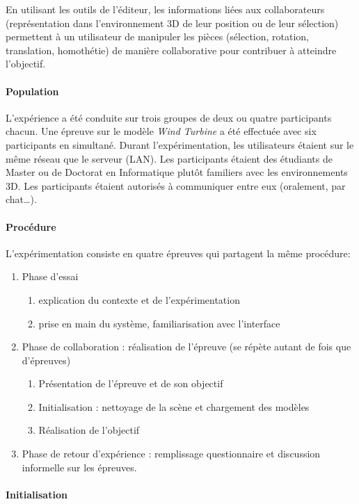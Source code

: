 En utilisant les outils de l'éditeur, les informations liées aux collaborateurs 
(représentation dans l'environnement \gls{3D} de leur position ou de leur sélection) permettent à un 
utilisateur de manipuler les pièces (sélection, rotation, translation, 
homothétie) de manière collaborative pour contribuer à atteindre l'objectif. 
\paragraph{Population}
L'expérience a été conduite sur trois groupes de deux ou quatre participants 
chacun. Une épreuve sur le modèle \textit{Wind Turbine} a été effectuée avec six participants 
en simultané.
Durant l'expérimentation, les utilisateurs étaient sur le même réseau que le serveur 
(\gls{LAN}). 
Les participants étaient des étudiants de Master ou de Doctorat en Informatique 
plutôt familiers avec les environnements \gls{3D}. Les participants étaient 
autorisés à 
communiquer entre eux (oralement, par chat\dots).
\paragraph{Procédure}
L'expérimentation consiste en quatre épreuves qui partagent la même procédure:
\begin{enumerate}
	\item Phase d'essai 
	\begin{enumerate}
		\item explication du contexte et de l'expérimentation 
		\item prise en main du système, familiarisation avec 
		l'interface 
	\end{enumerate}
	\item Phase de collaboration : réalisation de l'épreuve (se répète autant de fois 
	que d'épreuves)
	\begin{enumerate}
		\item Présentation de l'épreuve et de son objectif
		\item Initialisation : nettoyage de la scène et chargement des modèles
		\item Réalisation de l'objectif
	\end{enumerate}
	\item Phase de retour d'expérience : remplissage questionnaire et discussion 
	informelle sur les épreuves.
\end{enumerate}

\paragraph{Initialisation}

